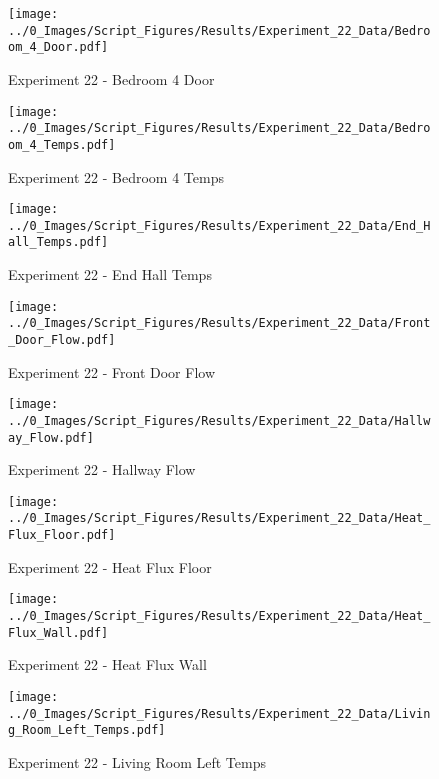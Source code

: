 	\clearpage

	\begin{figure}[H]
		\centering
		\texttt{[image: ../0\_Images/Script\_Figures/Results/Experiment\_22\_Data/Bedroom\_4\_Door.pdf]}
		\caption[]{Experiment 22 - Bedroom 4 Door}
	\end{figure}
 

	\begin{figure}[H]
		\centering
		\texttt{[image: ../0\_Images/Script\_Figures/Results/Experiment\_22\_Data/Bedroom\_4\_Temps.pdf]}
		\caption[]{Experiment 22 - Bedroom 4 Temps}
	\end{figure}
 
	\clearpage

	\begin{figure}[H]
		\centering
		\texttt{[image: ../0\_Images/Script\_Figures/Results/Experiment\_22\_Data/End\_Hall\_Temps.pdf]}
		\caption[]{Experiment 22 - End Hall Temps}
	\end{figure}
 

	\begin{figure}[H]
		\centering
		\texttt{[image: ../0\_Images/Script\_Figures/Results/Experiment\_22\_Data/Front\_Door\_Flow.pdf]}
		\caption[]{Experiment 22 - Front Door Flow}
	\end{figure}
 
	\clearpage

	\begin{figure}[H]
		\centering
		\texttt{[image: ../0\_Images/Script\_Figures/Results/Experiment\_22\_Data/Hallway\_Flow.pdf]}
		\caption[]{Experiment 22 - Hallway Flow}
	\end{figure}
 

	\begin{figure}[H]
		\centering
		\texttt{[image: ../0\_Images/Script\_Figures/Results/Experiment\_22\_Data/Heat\_Flux\_Floor.pdf]}
		\caption[]{Experiment 22 - Heat Flux Floor}
	\end{figure}
 
	\clearpage

	\begin{figure}[H]
		\centering
		\texttt{[image: ../0\_Images/Script\_Figures/Results/Experiment\_22\_Data/Heat\_Flux\_Wall.pdf]}
		\caption[]{Experiment 22 - Heat Flux Wall}
	\end{figure}
 

	\begin{figure}[H]
		\centering
		\texttt{[image: ../0\_Images/Script\_Figures/Results/Experiment\_22\_Data/Living\_Room\_Left\_Temps.pdf]}
		\caption[]{Experiment 22 - Living Room Left Temps}
	\end{figure}
 
